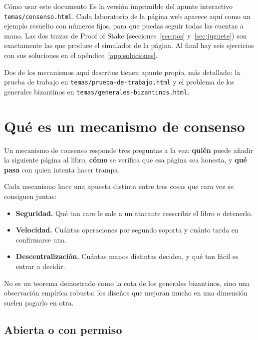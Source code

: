 \documentclass[11pt,a4paper]{article}
\theoremstyle{definition}
\theoremstyle{plain}
\theoremstyle{remark}
\begin{document}
\tableofcontents
\clearpage

\begin{nota}{Cómo usar este documento}
Es la versión imprimible del apunte interactivo \texttt{temas/consenso.html}.
Cada laboratorio de la página web aparece aquí como un ejemplo resuelto con
números fijos, para que puedas seguir todas las cuentas a mano. Las dos trazas de
Proof of Stake (secciones~\ref{sec:pos} y~\ref{sec:juguete}) son exactamente las
que produce el simulador de la página. Al final hay seis ejercicios con sus
soluciones en el apéndice~\ref{app:soluciones}.

Dos de los mecanismos aquí descritos tienen apunte propio, más detallado:
la prueba de trabajo en \texttt{temas/prueba-de-trabajo.html} y el problema de
los generales bizantinos en \texttt{temas/generales-bizantinos.html}.
\end{nota}

\section{Qué es un mecanismo de consenso}\label{sec:que-es}

Un mecanismo de consenso responde tres preguntas a la vez: \textbf{quién} puede
añadir la siguiente página al libro, \textbf{cómo} se verifica que esa página sea
honesta, y \textbf{qué pasa} con quien intenta hacer trampa.

Cada mecanismo hace una apuesta distinta entre tres cosas que rara vez se
consiguen juntas:

\begin{itemize}
  \item \textbf{Seguridad.} Qué tan caro le sale a un atacante reescribir el
        libro o detenerlo.
  \item \textbf{Velocidad.} Cuántas operaciones por segundo soporta y cuánto
        tarda en confirmarse una.
  \item \textbf{Descentralización.} Cuántas manos distintas deciden, y qué tan
        fácil es entrar a decidir.
\end{itemize}

No es un teorema demostrado como la cota de los generales bizantinos, sino una
observación empírica robusta: los diseños que mejoran mucho en una dimensión
suelen pagarlo en otra.

\subsection{Abierta o con permiso}
\end{document}
